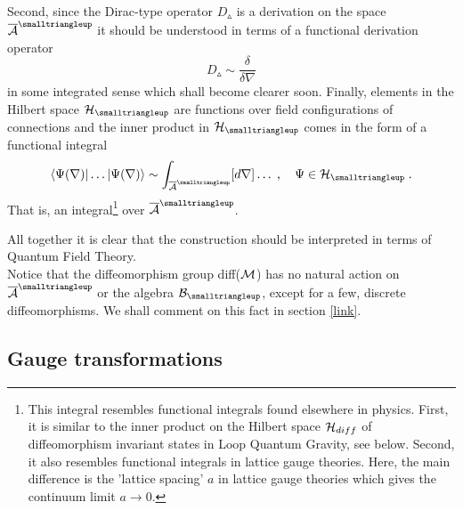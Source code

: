 \documentclass[12pt]{article}
\newcommand{\ba}{\begin{eqnarray}}
\newcommand{\ea}{\end{eqnarray}}
\def\d{\delta}
\def\ca{{\cal A}}
\def\cb{{\cal B}}
\def\ch{{\cal H}}
\def\cm{{\cal M}}
\begin{document}
Second, since the Dirac-type operator $D_{\smalltriangleup}$ is a derivation on the space $\overline{\ca}^{\smalltriangleup}$ it should be understood in terms of a functional derivation operator
\[
D_{\smalltriangleup} \sim \frac{\d}{\d \nabla}
\]
in some integrated sense which shall become clearer soon. Finally, elements in the Hilbert space $\ch_\smalltriangleup$ are functions over field configurations of connections and the inner product in $\ch_\smalltriangleup$ comes in the form of a functional integral
\ba
\langle\Psi(\nabla)|\ldots |\Psi(\nabla)\rangle\sim\int_{\overline{\ca}^{\smalltriangleup}}[d\nabla]\ldots\;,\quad\Psi\in\ch_{\smalltriangleup}\;.
\label{funcint}
\ea
That is, an integral\footnote{This integral resembles functional integrals found elsewhere in physics. First, it is similar to the inner product on the Hilbert space $\ch_{\small diff}$ of diffeomorphism invariant states in Loop Quantum Gravity, see below. Second, it also resembles functional integrals in lattice gauge theories. Here, the main difference is the 'lattice spacing' $a$ in lattice gauge theories which gives the continuum limit $a\rightarrow 0$.  } over $\overline{\ca}^{\smalltriangleup}$.





 All together it is clear that the construction should be interpreted in terms of Quantum Field Theory. \\





Notice that the diffeomorphism group diff($\cm$) has no natural action on $\overline{\ca}^{\smalltriangleup}$ or the algebra $\cb_{\smalltriangleup}$, except for a few, discrete diffeomorphisms. We shall comment on this fact in section \ref{link}.





\subsection{Gauge transformations}
\end{document}
